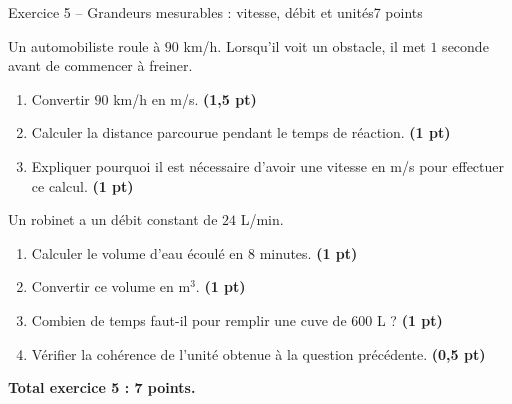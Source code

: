 \documentclass[11pt,a4paper]{article}
\newcommand{\pts}[1]{\hfill \textbf{(#1 pt)}}
\begin{document}
\begin{exercicebox}{Exercice 5 -- Grandeurs mesurables : vitesse, débit et unités}{7 points}

Un automobiliste roule à $90$ km/h. Lorsqu’il voit un obstacle, il met $1$ seconde avant de commencer à freiner.

\begin{enumerate}
    \item Convertir $90$ km/h en m/s. \pts{1,5}

    \item Calculer la distance parcourue pendant le temps de réaction. \pts{1}

    \item Expliquer pourquoi il est nécessaire d’avoir une vitesse en m/s pour effectuer ce calcul. \pts{1}
\end{enumerate}

Un robinet a un débit constant de $24$ L/min.

\begin{enumerate}[resume]
    \item Calculer le volume d’eau écoulé en $8$ minutes. \pts{1}

    \item Convertir ce volume en m$^3$. \pts{1}

    \item Combien de temps faut-il pour remplir une cuve de $600$ L ? \pts{1}

    \item Vérifier la cohérence de l’unité obtenue à la question précédente. \pts{0,5}
\end{enumerate}

\textbf{Total exercice 5 : 7 points.}

\end{exercicebox}
\end{document}
